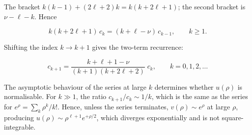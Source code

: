 The bracket $k(k-1) + (2\ell+2)k = k(k+2\ell+1)$; the second bracket is $\nu - \ell - k$. Hence
\begin{linenomath}
\begin{equation*}
k(k+2\ell+1)\,c_k = (k + \ell - \nu)\,c_{k-1},
\qquad k \ge 1.
\end{equation*}
\end{linenomath}
Shifting the index $k \to k+1$ gives the two-term recurrence:
\begin{linenomath}
\begin{equation}
c_{k+1} = \frac{k + \ell + 1 - \nu}{(k+1)(k+2\ell+2)}\;c_k, \qquad k = 0,1,2,\ldots
\label{eq:hydrogen-recurrence}
\end{equation}
\end{linenomath}
The asymptotic behaviour of the series at large $k$ determines whether $u(\rho)$ is normalisable. For $k \gg 1$, the ratio $c_{k+1}/c_k \sim 1/k$, which is the same as the series for $e^\rho = \sum_k \rho^k/k!$. Hence, unless the series terminates, $v(\rho) \sim e^{\rho}$ at large $\rho$, producing $u(\rho) \sim \rho^{\ell+1}e^{+\rho/2}$, which diverges exponentially and is not square-integrable.

